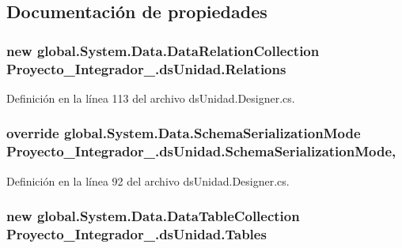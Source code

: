 \subsection{Documentación de propiedades}
\hypertarget{class_proyecto___integrador__3_1_1ds_unidad_a4341745873b49fbaa39cd3562161c504}{
\subsubsection[{Relations}]{\setlength{\rightskip}{0pt plus 5cm}new global.\-System.\-Data.\-Data\-Relation\-Collection Proyecto\-\_\-\-Integrador\-\_.\-ds\-Unidad.\-Relations\hspace{0.3cm}{\ttfamily [get]}}}\label{class_proyecto___integrador__3_1_1ds_unidad_a4341745873b49fbaa39cd3562161c504}


Definición en la línea 113 del archivo ds\-Unidad.\-Designer.\-cs.

\hypertarget{class_proyecto___integrador__3_1_1ds_unidad_ae681aadb8c80cfb04e19826c6608871d}{
\subsubsection[{Schema\-Serialization\-Mode}]{\setlength{\rightskip}{0pt plus 5cm}override global.\-System.\-Data.\-Schema\-Serialization\-Mode Proyecto\-\_\-\-Integrador\-\_.\-ds\-Unidad.\-Schema\-Serialization\-Mode\hspace{0.3cm}{\ttfamily [get]}, {\ttfamily [set]}}}\label{class_proyecto___integrador__3_1_1ds_unidad_ae681aadb8c80cfb04e19826c6608871d}


Definición en la línea 92 del archivo ds\-Unidad.\-Designer.\-cs.

\hypertarget{class_proyecto___integrador__3_1_1ds_unidad_ac3f1357f878bf8848284f29737f47276}{
\subsubsection[{Tables}]{\setlength{\rightskip}{0pt plus 5cm}new global.\-System.\-Data.\-Data\-Table\-Collection Proyecto\-\_\-\-Integrador\-\_.\-ds\-Unidad.\-Tables\hspace{0.3cm}{\ttfamily [get]}}}\label{class_proyecto___integrador__3_1_1ds_unidad_ac3f1357f878bf8848284f29737f47276}


